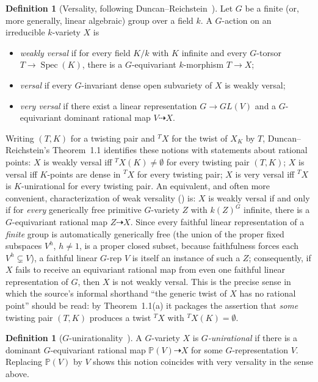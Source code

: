 \documentclass[11pt]{article}
\theoremstyle{plain}
\theoremstyle{definition}
\newtheorem{definition}[theorem]{Definition}
\theoremstyle{remark}
\newcommand{\PP}{\mathbb P}
\newcommand{\dashto}{\dashrightarrow}
\begin{document}
\begin{definition}[Versality, following Duncan--Reichstein~\cite{DR}]
Let $G$ be a finite (or, more generally, linear algebraic) group over a
field $k$. A $G$-action on an irreducible $k$-variety $X$ is
\begin{itemize}
\item \emph{weakly versal} if for every field $K/k$ with $K$ infinite
and every $G$-torsor $T\to\operatorname{Spec}(K)$, there is a
$G$-equivariant $k$-morphism $T\to X$;
\item \emph{versal} if every $G$-invariant dense open subvariety of $X$
is weakly versal;
\item \emph{very versal} if there exist a linear representation $G\to
GL(V)$ and a $G$-equivariant dominant rational map $V\dashto X$.
\end{itemize}
Writing $(T,K)$ for a twisting pair and ${}^TX$ for the twist of $X_K$
by $T$, Duncan--Reichstein's Theorem~1.1 identifies these notions with
statements about rational points: $X$ is weakly versal iff ${}^TX(K)
\ne\emptyset$ for every twisting pair $(T,K)$; $X$ is versal iff
$K$-points are dense in ${}^TX$ for every twisting pair; $X$ is very
versal iff ${}^TX$ is $K$-unirational for every twisting pair. An
equivalent, and often more convenient, characterization of weak
versality (\cite[Remark~2.1]{DR}) is: $X$ is weakly versal if and only
if for \emph{every} generically free primitive $G$-variety $Z$ with
$k(Z)^G$ infinite, there is a $G$-equivariant rational map $Z\dashto X$.
Since every faithful linear representation of a \emph{finite} group is
automatically generically free (the union of the proper fixed
subspaces $V^h$, $h\ne 1$, is a proper closed subset, because
faithfulness forces each $V^h\subsetneq V$), a faithful linear $G$-rep
$V$ is itself an instance of such a $Z$; consequently, if $X$ fails to
receive an equivariant rational map from even one faithful linear
representation of $G$, then $X$ is not weakly versal. This is the
precise sense in which the source's informal shorthand ``the generic
twist of $X$ has no rational point'' should be read: by Theorem~1.1(a)
it packages the assertion that \emph{some} twisting pair $(T,K)$
produces a twist ${}^TX$ with ${}^TX(K)=\emptyset$.
\end{definition}

\begin{definition}[$G$-unirationality~\cite{CTZ}]
A $G$-variety $X$ is \emph{$G$-unirational} if there is a dominant
$G$-equivariant rational map $\PP(V)\dashto X$ for some
$G$-representation $V$. Replacing $\PP(V)$ by $V$ shows this notion
coincides with very versality in the sense above.
\end{definition}
\end{document}
